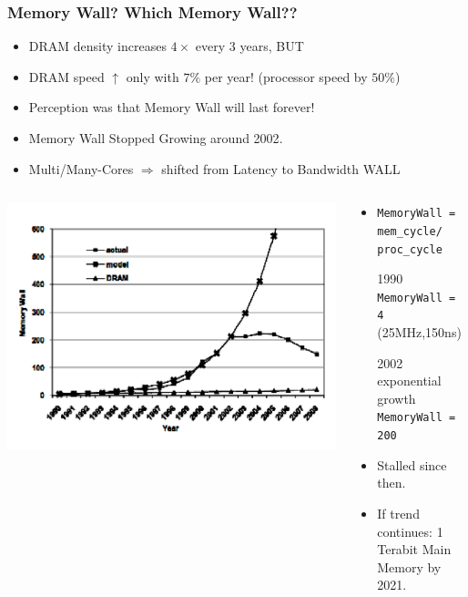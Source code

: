 \documentclass{beamer}
\renewcommand{\emph}[1]{\textcolor{structure}{#1}}
\newcommand{\emp}[1]{\textcolor{DikuRed}{ #1}}
\begin{document}
\begin{frame}[fragile,t]
\frametitle{Memory Wall? Which Memory Wall??}

\begin{itemize}
            \item \emph{DRAM density increases $4\times$ every 3 years, BUT} \smallskip

            \item \emp{DRAM speed $\uparrow$ only with $7\%$ per year!} 
                    (processor speed by $50\%$) 

            \item \alert{Perception was that Memory Wall will last forever!}

            \item \emph{Memory Wall Stopped Growing around 2002}.
    
            \item Multi/Many-Cores $\Rightarrow$ shifted from Latency 
                    to \emp{Bandwidth WALL}
\end  {itemize}
\vspace{-3ex}

\begin{columns}
\includegraphics[width=50ex]{Figures/L1/MemWall}
\begin{scriptsize}
\begin{itemize}
\item {\tt MemoryWall = mem\_cycle/ proc\_cycle} \smallskip
\item[1990] {\tt MemoryWall = 4} (25MHz,150ns)
\item[2002] exponential growth {\tt MemoryWall = 200} 
\item Stalled since then.
\item If trend continues: 1 Terabit Main Memory by 2021.
\end{itemize}
\end{scriptsize}
\end{columns}

\end{frame}
\end{document}
